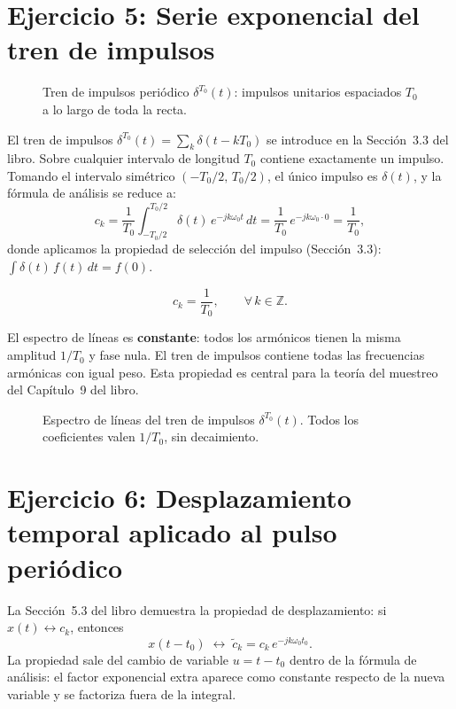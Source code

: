 \documentclass[10pt,a4paper]{article}
\begin{document}
	\section*{Ejercicio 5: Serie exponencial del tren de impulsos}

	\begin{figure}[H]
		\centering
		
		\caption{Tren de impulsos periódico $\delta^{T_0}(t)$: impulsos unitarios espaciados $T_0$ a lo largo de toda la recta.}
		\label{fig:ej5_senal}
	\end{figure}

	El tren de impulsos $\delta^{T_0}(t) = \sum_{k} \delta(t - kT_0)$ se introduce en la Sección~3.3 del libro. Sobre cualquier intervalo de longitud $T_0$ contiene exactamente un impulso. Tomando el intervalo simétrico $(-T_0/2,\, T_0/2)$, el único impulso es $\delta(t)$, y la fórmula de análisis se reduce a:
	\[
		c_k = \frac{1}{T_0}\int_{-T_0/2}^{T_0/2} \delta(t)\,e^{-jk\omega_0 t}\,dt
		= \frac{1}{T_0}\,e^{-jk\omega_0 \cdot 0}
		= \frac{1}{T_0},
	\]
	donde aplicamos la propiedad de selección del impulso (Sección~3.3): $\int \delta(t)\,f(t)\,dt = f(0)$.

	\[
		\boxed{c_k = \frac{1}{T_0}, \qquad \forall\,k \in \mathbb{Z}.}
	\]

	El espectro de líneas es \textbf{constante}: todos los armónicos tienen la misma amplitud $1/T_0$ y fase nula. El tren de impulsos contiene todas las frecuencias armónicas con igual peso. Esta propiedad es central para la teoría del muestreo del Capítulo~9 del libro.

	\begin{figure}[H]
		\centering
		
		\caption{Espectro de líneas del tren de impulsos $\delta^{T_0}(t)$. Todos los coeficientes valen $1/T_0$, sin decaimiento.}
		\label{fig:ej5}
	\end{figure}

	\section*{Ejercicio 6: Desplazamiento temporal aplicado al pulso periódico}

	La Sección~5.3 del libro demuestra la propiedad de desplazamiento: si $x(t) \leftrightarrow c_k$, entonces
	\[
		x(t - t_0) \;\leftrightarrow\; \tilde{c}_k = c_k\,e^{-jk\omega_0 t_0}.
	\]
	La propiedad sale del cambio de variable $u = t - t_0$ dentro de la fórmula de análisis: el factor exponencial extra aparece como constante respecto de la nueva variable y se factoriza fuera de la integral.
\end{document}
